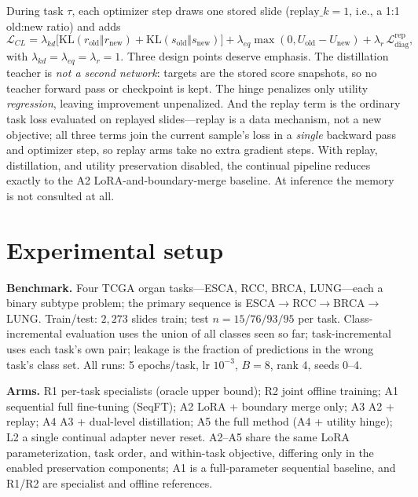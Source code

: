 \documentclass{article}
\begin{document}
During task $\tau$, each optimizer step draws one stored slide ($\mathrm{replay}\_k{=}1$, i.e., a 1:1 old:new ratio) and adds
\begin{equation}
\mathcal{L}_{CL} = \lambda_{kd}\big[\mathrm{KL}(r_{\mathrm{old}}\Vert r_{\mathrm{new}}) + \mathrm{KL}(s_{\mathrm{old}}\Vert s_{\mathrm{new}})\big] + \lambda_{eq}\max(0, U_{\mathrm{old}} - U_{\mathrm{new}}) + \lambda_{r}\,\mathcal{L}_{\mathrm{diag}}^{\mathrm{rep}},
\end{equation}
with $\lambda_{kd}{=}\lambda_{eq}{=}\lambda_{r}{=}1$. Three design points deserve emphasis. The distillation teacher is \emph{not a second network}: targets are the stored score snapshots, so no teacher forward pass or checkpoint is kept. The hinge penalizes only utility \emph{regression}, leaving improvement unpenalized. And the replay term is the ordinary task loss evaluated on replayed slides---replay is a data mechanism, not a new objective; all three terms join the current sample's loss in a \emph{single} backward pass and optimizer step, so replay arms take no extra gradient steps. With replay, distillation, and utility preservation disabled, the continual pipeline reduces exactly to the A2 LoRA-and-boundary-merge baseline. At inference the memory is not consulted at all.

\section{Experimental setup}
\label{sec:setup}
\textbf{Benchmark.} Four TCGA organ tasks---ESCA, RCC, BRCA, LUNG---each a binary subtype problem; the primary sequence is ESCA${\to}$RCC${\to}$BRCA${\to}$LUNG. Train/test: $2{,}273$ slides train; test $n=15/76/93/95$ per task. Class-incremental evaluation uses the union of all classes seen so far; task-incremental uses each task's own pair; leakage is the fraction of predictions in the wrong task's class set. All runs: 5 epochs/task, lr $10^{-3}$, $B{=}8$, rank 4, seeds 0--4.

\textbf{Arms.} R1 per-task specialists (oracle upper bound); R2 joint offline training; A1 sequential full fine-tuning (SeqFT); A2 LoRA + boundary merge only; A3 A2 + replay; A4 A3 + dual-level distillation; A5 the full method (A4 + utility hinge); L2 a single continual adapter never reset. A2--A5 share the same LoRA parameterization, task order, and within-task objective, differing only in the enabled preservation components; A1 is a full-parameter sequential baseline, and R1/R2 are specialist and offline references.
\end{document}
